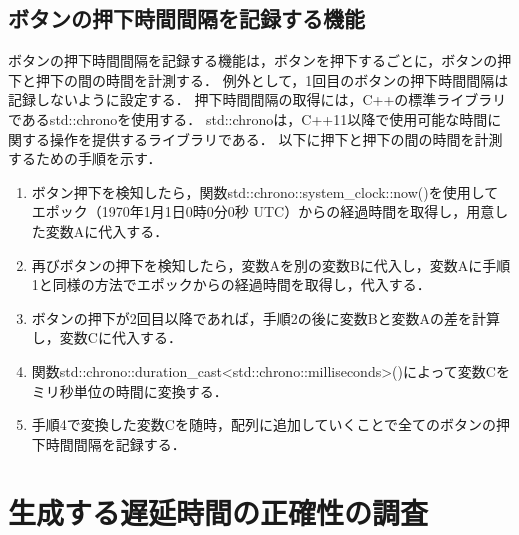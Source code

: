 \subsection{ボタンの押下時間間隔を記録する機能}
ボタンの押下時間間隔を記録する機能は，ボタンを押下するごとに，ボタンの押下と押下の間の時間を計測する．
例外として，1回目のボタンの押下時間間隔は記録しないように設定する．
押下時間間隔の取得には，C++の標準ライブラリであるstd::chronoを使用する．
std::chronoは，C++11以降で使用可能な時間に関する操作を提供するライブラリである．
以下に押下と押下の間の時間を計測するための手順を示す．
\begin{enumerate}[leftmargin=*]
\item ボタン押下を検知したら，関数std::chrono::system\_clock::now()を使用してエポック（1970年1月1日0時0分0秒 UTC）からの経過時間を取得し，用意した変数Aに代入する．
\item 再びボタンの押下を検知したら，変数Aを別の変数Bに代入し，変数Aに手順1と同様の方法でエポックからの経過時間を取得し，代入する．
\item ボタンの押下が2回目以降であれば，手順2の後に変数Bと変数Aの差を計算し，変数Cに代入する．
\item 関数std::chrono::duration\_cast\textless std::chrono::milliseconds\textgreater()によって変数Cをミリ秒単位の時間に変換する．
\item 手順4で変換した変数Cを随時，配列に追加していくことで全てのボタンの押下時間間隔を記録する．
\end{enumerate}
\section{生成する遅延時間の正確性の調査}
